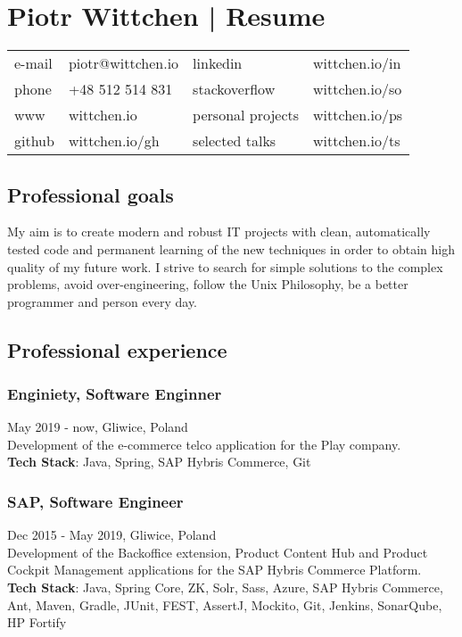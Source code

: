 \documentclass{article}
\begin{document}
  \section*{Piotr Wittchen | Resume}

  \begin{tabular}{llll}\small
    e-mail & piotr@wittchen.io & linkedin          & wittchen.io/in \\
    phone  & +48 512 514 831   & stackoverflow     & wittchen.io/so \\
    www    & wittchen.io       & personal projects & wittchen.io/ps \\
    github & wittchen.io/gh    & selected talks    & wittchen.io/ts \\
  \end{tabular}

    \subsection*{Professional goals}
    \small{My aim is to create modern and robust IT projects with clean,
    automatically tested code and permanent learning of the new techniques
    in order to obtain high quality of my future work.
    I strive to search for simple solutions to the complex problems,
    avoid over-engineering, follow the Unix Philosophy,
    be a better programmer and person every day.}

    \subsection*{Professional experience}

      \subsubsection*{Enginiety, Software Enginner}
      May 2019 - now, Gliwice, Poland\\[0.3em] 
      Development of the e-commerce telco application for the Play company.\\
      \textbf{Tech Stack}: Java, Spring, SAP Hybris Commerce, Git

      \subsubsection*{SAP, Software Engineer} 
      Dec 2015 - May 2019, Gliwice, Poland\\[0.3em]
      Development of the Backoffice extension, Product Content Hub 
      and Product Cockpit Management applications for the SAP Hybris Commerce Platform.\\
      \textbf{Tech Stack}: Java, Spring Core, ZK, Solr, Sass, Azure, 
      SAP Hybris Commerce, Ant, Maven, Gradle, JUnit, FEST, AssertJ, 
      Mockito, Git, Jenkins, SonarQube, HP Fortify
\end{document}
